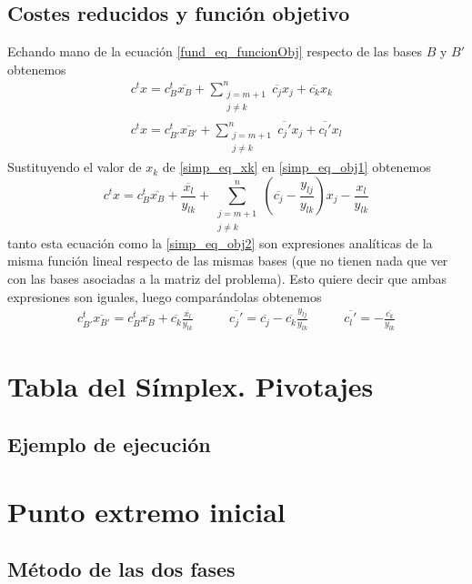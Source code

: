 \subsection{Costes reducidos y función objetivo}
Echando mano de la ecuación \eqref{fund_eq_funcionObj} respecto de las bases $B$ y $B'$ obtenemos
\begin{gather}
	c^tx=c_B^t\overline{x_B}+\sum_{\substack{j=m+1\\j\not=k}}^{n}\overline{c_j}x_j+\overline{c_k}x_k\label{simp_eq_obj1}\\
	c^tx=c_{B'}^t\overline{x_{B'}}+\sum_{\substack{j=m+1\\j\not=k}}^{n}\overline{c_j'}x_j+\overline{c_l'}x_l\label{simp_eq_obj2}
\end{gather}
Sustituyendo el valor de $x_k$ de \eqref{simp_eq_xk} en \eqref{simp_eq_obj1} obtenemos
\begin{equation*}
	c^tx=c_B^t\overline{x_B}+\frac{\overline{x_l}}{y_{lk}}+\sum_{\substack{j=m+1\\j\not=k}}^{n}\left(\overline{c_j}-\frac{y_{lj}}{y_{lk}}\right)x_j-\frac{x_l}{y_{lk}}
\end{equation*}
tanto esta ecuación como la \eqref{simp_eq_obj2} son expresiones analíticas de la misma función lineal respecto de las mismas bases (que no tienen nada que ver con las bases asociadas a la matriz del problema). Esto quiere decir que ambas expresiones son iguales, luego comparándolas obtenemos
\begin{equation}
	\begin{array}{ccc}
	\displaystyle{c_{B'}^t\overline{x_{B'}}=c_B^t\overline{x_B}+\overline{c_k}\frac{\overline{x_l}}{y_{lk}}}\qquad&\displaystyle{\overline{c_j'}=\overline{c_j}-\overline{c_k}\frac{y_{lj}}{y_{lk}}}\qquad&
	\displaystyle{\overline{c_l'}=-\frac{\overline{c_k}}{y_{lk}}}\end{array}
\end{equation}
\section{Tabla del Símplex. Pivotajes}
\subsection{Ejemplo de ejecución}
\section{Punto extremo inicial}
\subsection{Método de las dos fases}

